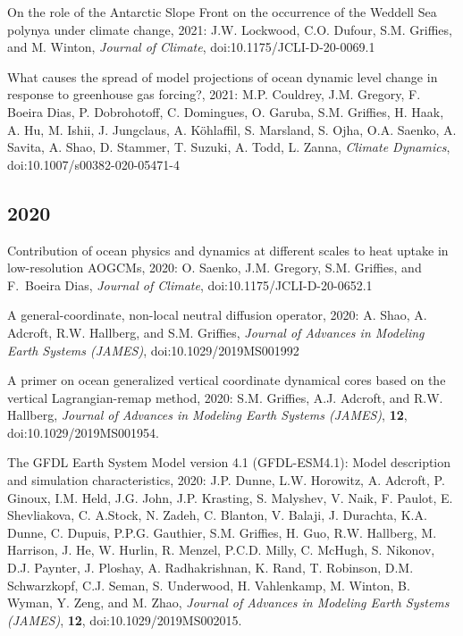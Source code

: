 \begin{etaremune}
\item On the role of the Antarctic Slope Front on the occurrence of the Weddell Sea polynya under climate change, 2021: J.W. Lockwood, C.O. Dufour, S.M. Grif\/f\/ies, and M. Winton, {\it Journal of Climate}, doi:10.1175/JCLI-D-20-0069.1

\item What causes the spread of model projections of ocean dynamic level change in response to greenhouse gas forcing?, 2021:  M.P. Couldrey, J.M. Gregory,  F. Boeira Dias, P. Dobrohotoff, C. Domingues, O. Garuba, S.M. Griffies, H. Haak, A. Hu, M. Ishii, J. Jungclaus, A. {K\"{o}hlaffil}, S. Marsland, S. Ojha, O.A. Saenko, A. Savita, A. Shao, D. Stammer, T. Suzuki, A. Todd, L. Zanna, {\it Climate Dynamics}, doi:10.1007/s00382-020-05471-4


\subsection*{\sc \color{Maroon} 2020}

\item Contribution of ocean physics and dynamics at different scales to heat uptake in low-resolution AOGCMs, 2020: O. Saenko, J.M. Gregory, S.M. Grif\/f\/ies, and F.\ Boeira Dias, {\it Journal of Climate}, doi:10.1175/JCLI-D-20-0652.1

\item A general-coordinate, non-local neutral diffusion operator, 2020: A. Shao, A. Adcroft, R.W. Hallberg, and S.M. Grif\/f\/ies, {\it Journal of Advances in Modeling Earth Systems (JAMES)}, doi:10.1029/2019MS001992



\item A primer on ocean generalized vertical coordinate dynamical cores based on the vertical Lagrangian-remap method, 2020: S.M. Grif\/f\/ies, A.J. Adcroft, and R.W. Hallberg, {\it Journal of Advances in Modeling Earth Systems (JAMES)}, {\bf 12}, \\ doi:10.1029/2019MS001954.

\item The GFDL Earth System Model version 4.1 (GFDL-ESM4.1): Model description and simulation characteristics, 2020: J.P. Dunne, L.W. Horowitz, A. Adcroft, P. Ginoux, I.M. Held, J.G. John, J.P. Krasting, S. Malyshev, V. Naik, F. Paulot, E. Shevliakova, C. A.Stock, N. Zadeh, C. Blanton, V. Balaji, J. Durachta, K.A. Dunne, C. Dupuis, P.P.G. Gauthier, S.M. Griffies, H. Guo, R.W. Hallberg, M. Harrison, J. He, W. Hurlin, R. Menzel, P.C.D. Milly, C. McHugh, S. Nikonov, D.J. Paynter, J. Ploshay, A. Radhakrishnan, K. Rand, T. Robinson, D.M. Schwarzkopf, C.J. Seman, S. Underwood, H. Vahlenkamp, M. Winton, B. Wyman, Y. Zeng, and M. Zhao, {\it Journal of Advances in Modeling Earth Systems (JAMES)}, {\bf 12}, doi:10.1029/2019MS002015.


\end{etaremune}
